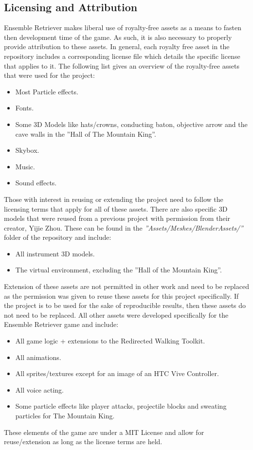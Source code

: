 \subsection{Licensing and Attribution}
Ensemble Retriever makes liberal use of royalty-free assets as a means to fasten then development time of the game. As such, it is also necessary to properly provide attribution to these assets. In general, each royalty free asset in the repository includes a corresponding license file which details the specific license that applies to it. The following list gives an overview of the royalty-free assets that were used for the project:
\begin{itemize}
    \item Most Particle effects.
    \item Fonts.
    \item Some 3D Models like hats/crowns, conducting baton, objective arrow and the cave walls in the ''Hall of The Mountain King''.
    \item Skybox.
    \item Music.
    \item Sound effects.
\end{itemize}
Those with interest in reusing or extending the project need to follow the licensing terms that apply for all of these assets. There are also specific 3D models that were reused from a previous project with permission from their creator, Yijie Zhou. These can be found in the \emph{''Assets/Meshes/BlenderAssets/''} folder of the repository and include:
\begin{itemize}
    \item All instrument 3D models.
    \item The virtual environment, excluding the ''Hall of the Mountain King''.
\end{itemize}
Extension of these assets are not permitted in other work and need to be replaced as the permission was given to reuse these assets for this project specifically. If the project is to be used for the sake of reproducible results, then these assets do not need to be replaced. All other assets were developed specifically for the Ensemble Retriever game and include:
\begin{itemize}
    \item All game logic + extensions to the Redirected Walking Toolkit.
    \item All animations.
    \item All sprites/textures except for an image of an HTC Vive Controller.
    \item All voice acting.
    \item Some particle effects like player attacks, projectile blocks and sweating particles for The Mountain King. 
\end{itemize}
These elements of the game are under a MIT License and allow for reuse/extension as long as the license terms are held. 

